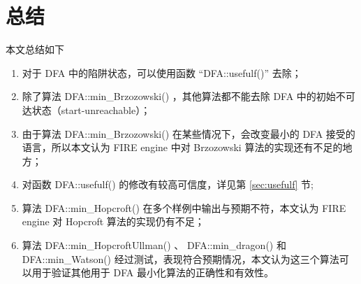 \chapter{总结}

本文总结如下
\begin{enumerate}
    \item 对于 DFA 中的陷阱状态，可以使用函数 “DFA::usefulf()” 去除；
    \item 除了算法 DFA::min\_Brzozowski() ，其他算法都不能去除 DFA 中的初始不可达状态（start-unreachable）；
    \item 由于算法 DFA::min\_Brzozowski() 在某些情况下，会改变最小的 DFA 接受的语言，所以本文认为 FIRE engine 中对 Brzozowski 算法的实现还有不足的地方；
    \item 对函数 DFA::usefulf() 的修改有较高可信度，详见第 \ref{sec:usefulf} 节;
    \item 算法 DFA::min\_Hopcroft() 在多个样例中输出与预期不符，本文认为 FIRE engine 对 Hopcroft 算法的实现仍有不足；
    \item 算法 DFA::min\_HopcroftUllman() 、 DFA::min\_dragon() 和 DFA::min\_Watson() 经过测试，表现符合预期情况，本文认为这三个算法可以用于验证其他用于 DFA 最小化算法的正确性和有效性。
\end{enumerate}


